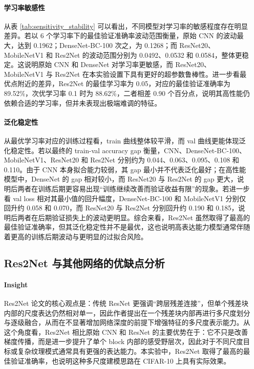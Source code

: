 \documentclass[a4paper]{article}
\begin{document}
\paragraph{学习率敏感性}
从表 \ref{tab:sensitivity_stability} 可以看出，不同模型对学习率的敏感程度存在明显差异。若以 6 个学习率下的最佳验证准确率波动范围衡量，原始 CNN 的波动最大，达到 0.1962；DenseNet-BC-100 次之，为 0.1268；而 ResNet20、MobileNetV1 和 Res2Net 的波动范围分别为 0.0492、0.0532 和 0.0584，整体更稳定。这说明原始 CNN 和 DenseNet 对学习率更敏感，而 ResNet20、MobileNetV1 与 Res2Net 在本实验设置下具有更好的超参数鲁棒性。进一步看最优点附近的差异，Res2Net 的最佳学习率为 0.05，对应的最佳验证准确率为 89.52\%，次优学习率 0.1 时为 88.62\%，二者相差 0.90 个百分点，说明其高性能仍依赖合适的学习率，但并未表现出极端难调的特征。

\paragraph{泛化稳定性}
从最优学习率对应的训练过程看，train 曲线整体较平滑，而 val 曲线更能体现泛化稳定性。若以最终的 train-val accuracy gap 衡量，CNN、DenseNet-BC-100、MobileNetV1、ResNet20 和 Res2Net 分别约为 0.044、0.063、0.095、0.108 和 0.110。由于 CNN 本身拟合能力较弱，其 gap 最小并不代表泛化最好；在高性能模型中，DenseNet 的 gap 相对较小，而 ResNet20 与 Res2Net 的 gap 更大，说明后两者在训练后期更容易出现“训练继续改善而验证收益有限”的现象。若进一步看 val loss 相对其最小值的回升幅度，DenseNet-BC-100 和 MobileNetV1 分别仅回升约 0.058 和 0.070，而 ResNet20 与 Res2Net 分别回升约 0.190 和 0.185，说明后两者在后期验证损失上的波动更明显。综合来看，Res2Net 虽然取得了最高的最佳验证准确率，但其泛化稳定性并不是最优，这也说明高表达能力模型通常伴随着更高的训练后期波动与更明显的过拟合风险。

\subsection{Res2Net 与其他网络的优缺点分析}
\paragraph{Insight}
Res2Net 论文的核心观点是：传统 ResNet 更强调“跨层残差连接”，但单个残差块内部的尺度表达仍然相对单一，因此作者提出在一个残差块内部再进行多尺度划分与逐级融合，从而在不显著增加网络深度的前提下增强特征的多尺度表示能力\cite{Res2Net}。从这个角度看，Res2Net 相比原始 CNN 和 ResNet 的主要优势在于：它不只是改善梯度传播，而是进一步提升了单个 block 内部的感受野层次，因此对于不同尺度目标或复杂纹理模式通常具有更强的表达能力。本实验中，Res2Net 取得了最高的最佳验证准确率，也说明这种多尺度建模思路在 CIFAR-10 上具有实际效果。
\end{document}
